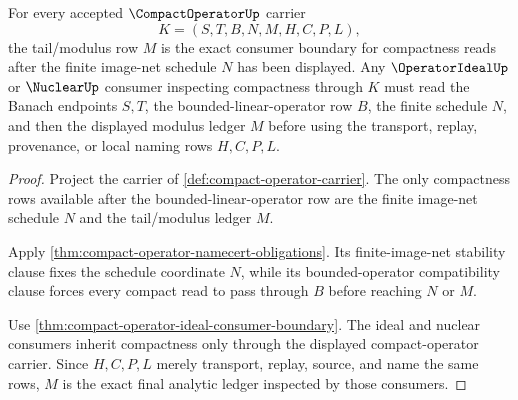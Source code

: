 \begin{theorem}
\label{thm:compact-operator-tail-modulus-consumer-exactness}
For every accepted $\CompactOperatorUp$ carrier
$$
K=(S,T,B,N,M,H,C,P,L),
$$
the tail/modulus row $M$ is the exact consumer boundary for compactness reads after the finite image-net schedule $N$ has been displayed. Any $\OperatorIdealUp$ or $\NuclearUp$ consumer inspecting compactness through $K$ must read the Banach endpoints $S,T$, the bounded-linear-operator row $B$, the finite schedule $N$, and then the displayed modulus ledger $M$ before using the transport, replay, provenance, or local naming rows $H,C,P,L$.
\end{theorem}
\begin{proof}
Project the carrier of \autoref{def:compact-operator-carrier}. The only compactness rows available after the bounded-linear-operator row are the finite image-net schedule $N$ and the tail/modulus ledger $M$.

Apply \autoref{thm:compact-operator-namecert-obligations}. Its finite-image-net stability clause fixes the schedule coordinate $N$, while its bounded-operator compatibility clause forces every compact read to pass through $B$ before reaching $N$ or $M$.

Use \autoref{thm:compact-operator-ideal-consumer-boundary}. The ideal and nuclear consumers inherit compactness only through the displayed compact-operator carrier. Since $H,C,P,L$ merely transport, replay, source, and name the same rows, $M$ is the exact final analytic ledger inspected by those consumers.
\end{proof}

